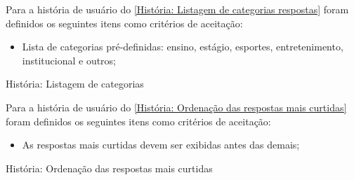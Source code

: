 Para a história de usuário do \autoref{História: Listagem de categorias respostas} foram definidos os seguintes itens como critérios de aceitação:

\begin{itemize}
\item Lista de categorias pré-definidas: ensino, estágio, esportes, entretenimento, institucional e outros;  
\end{itemize}

\def\arraystretch{2}
\begin{quadro}[htb]
\centering
\ABNTEXfontereduzida
\caption[História: Listagem de categorias]{História: Listagem de categorias}
\label{História: Listagem de categorias respostas}
\end{quadro}
\FloatBarrier

Para a história de usuário do \autoref{História: Ordenação das respostas mais curtidas} foram definidos os seguintes itens como critérios de aceitação:

\begin{itemize}
\item As respostas mais curtidas devem ser exibidas antes das demais;
\end{itemize}

\def\arraystretch{2}
\begin{quadro}[htb]
\centering
\ABNTEXfontereduzida
\caption[História: Ordenação das respostas mais curtidas]{História: Ordenação das respostas mais curtidas}
\label{História: Ordenação das respostas mais curtidas}
\end{quadro}
\FloatBarrier 

